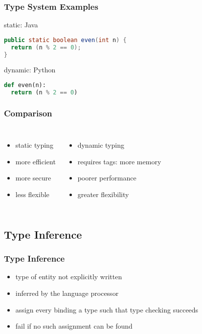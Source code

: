 \documentclass[dvipsnames]{beamer}
\theoremstyle{plain}
\begin{document}
\begin{frame}[fragile]
  \frametitle{Type System Examples}

  \begin{exampleblock}{static: Java}
    \begin{lstlisting}[language=Java]
public static boolean even(int n) {
  return (n % 2 == 0);
}
    \end{lstlisting}
  \end{exampleblock}

  \begin{exampleblock}{dynamic: Python}
    \begin{lstlisting}[language=Python]
def even(n):
  return (n % 2 == 0)
    \end{lstlisting}
  \end{exampleblock}
\end{frame}

\begin{frame}
  \frametitle{Comparison}

  \begin{columns}[t]
    \begin{itemize}
      \item static typing
      \smallskip
      \item more efficient
      \item more secure
      \item less flexible
    \end{itemize}

    \begin{itemize}
      \item dynamic typing
      \smallskip
      \item requires tags: more memory
      \item poorer performance
      \item greater flexibility
    \end{itemize}
  \end{columns}
\end{frame}

\subsection{Type Inference}

\begin{frame}
  \frametitle{Type Inference}

  \begin{itemize}
    \item type of entity not explicitly written
    \item inferred by the language processor

    \medskip
    \item assign every binding a type such that type checking succeeds
    \item fail if no such assignment can be found
  \end{itemize}
\end{frame}
\end{document}
